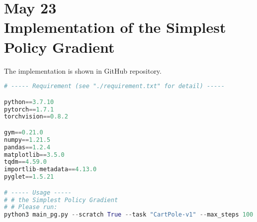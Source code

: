 \section{May 23\\ 
{\large Implementation of the Simplest Policy Gradient}}

The implementation is shown in GitHub repository.

\begin{lstlisting}[language=Python, caption=Python example]
# ----- Requirement (see "./requirement.txt" for detail) ----- 

python==3.7.10
pytorch==1.7.1
torchvision==0.8.2

gym==0.21.0
numpy==1.21.5
pandas==1.2.4
matplotlib==3.5.0
tqdm==4.59.0
importlib-metadata==4.13.0
pyglet==1.5.21

# ----- Usage ----- 
# # the Simplest Policy Gradient
# # Please run: 
python3 main_pg.py --scratch True --task "CartPole-v1" --max_steps 100 --num_episodes 10000 --learn_rate 1e-3 --save_after 10000
\end{lstlisting}